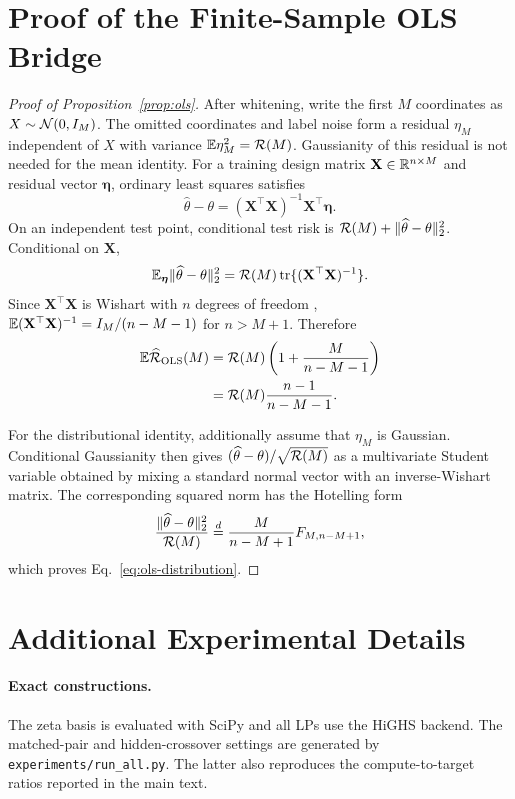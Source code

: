 \section{Proof of the Finite-Sample OLS Bridge}

\begin{proof}[Proof of Proposition~\ref{prop:ols}]
After whitening, write the first $M$ coordinates as $X\sim\mathcal{N}(0,I_M)$. The omitted coordinates and label noise form a residual $\eta_M$ independent of $X$ with variance
$\mathbb{E}\eta_M^2=\mathcal{R}(M)$. Gaussianity of this residual is not needed for the mean identity. For a training design matrix $\mathbf X\in\mathbb{R}^{n\times M}$ and residual vector $\boldsymbol\eta$, ordinary least squares satisfies
\[
\widehat\theta-\theta=(\mathbf X^\top\mathbf X)^{-1}\mathbf X^\top\boldsymbol\eta.
\]
On an independent test point, conditional test risk is
$\mathcal{R}(M)+\|\widehat\theta-\theta\|_2^2$. Conditional on $\mathbf X$,
\[
\mathbb{E}_{\boldsymbol\eta}\|\widehat\theta-\theta\|_2^2
=\mathcal{R}(M)\operatorname{tr}\{(\mathbf X^\top\mathbf X)^{-1}\}.
\]
Since $\mathbf X^\top\mathbf X$ is Wishart with $n$ degrees of freedom \citep{muirhead1982aspects},
$\mathbb{E}(\mathbf X^\top\mathbf X)^{-1}=I_M/(n-M-1)$ for $n>M+1$. Therefore
\begin{align*}
\mathbb{E}\widehat{\mathcal{R}}_{\mathrm{OLS}}(M)
&=\mathcal{R}(M)\left(1+\frac{M}{n-M-1}\right)\\
&=\mathcal{R}(M)\frac{n-1}{n-M-1}.
\end{align*}

For the distributional identity, additionally assume that $\eta_M$ is Gaussian. Conditional Gaussianity then gives
$(\widehat\theta-\theta)/\sqrt{\mathcal{R}(M)}$ as a multivariate Student variable obtained by mixing a standard normal vector with an inverse-Wishart matrix. The corresponding squared norm has the Hotelling form
\[
\frac{\|\widehat\theta-\theta\|_2^2}{\mathcal{R}(M)}
\overset d=\frac{M}{n-M+1}F_{M,n-M+1},
\]
which proves Eq.~\eqref{eq:ols-distribution}.
\end{proof}

\section{Additional Experimental Details}

\paragraph{Exact constructions.}
The zeta basis is evaluated with SciPy and all LPs use the HiGHS backend. The matched-pair and hidden-crossover settings are generated by \texttt{experiments/run\_all.py}. The latter also reproduces the compute-to-target ratios reported in the main text.

